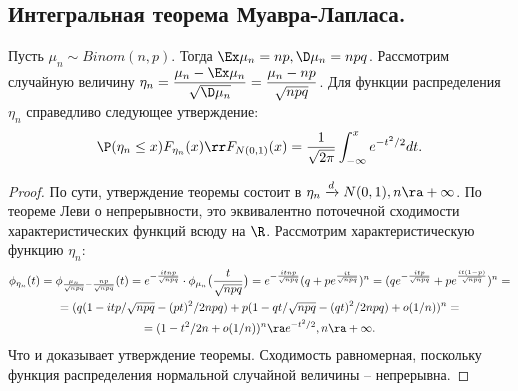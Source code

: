 \subsection{Интегральная теорема Муавра-Лапласа.}
\begin{theorem}
    Пусть $\mu_n \sim Binom(n, p)$.
    Тогда $\Ex \mu_n = np, \D \mu_n = npq$.
    Рассмотрим случайную величину $\eta_n = \dfrac{\mu_n - \Ex \mu_n}{\sqrt {\D \mu_n}} = \dfrac{\mu_n - np}{\sqrt {npq}}$.
    Для функции распределения $\eta_n$ справедливо следующее утверждение: \[\P(\eta_n \leq x) F_{\eta_n}(x) \rr F_{N(0, 1)}(x) = \dfrac{1}{\sqrt {2\pi}}\int_{-\infty}^x e^{-t^2/2}dt.\]
\end{theorem}
\begin{proof}
    По сути, утверждение теоремы состоит в $\eta_n \xrightarrow{d} N(0, 1), n \ra +\infty$.
    По теореме Леви о непрерывности, это эквивалентно поточечной сходимости характеристических функций всюду на $\R$.
    Рассмотрим характеристическую функцию $\eta_n$:
    \begin{multline*}
        \phi_{\eta_n}(t) = \phi_{\frac{\mu_n}{\sqrt {npq}} - \frac{np}{\sqrt {npq}}}(t) = e^{-\frac{itnp}{\sqrt {npq}}}\cdot \phi_{\mu_n}\big(\frac{t}{\sqrt {npq}}\big) = e^{-\frac{itnp}{\sqrt {npq}}}(q + pe^{\frac{it}{\sqrt {npq}}})^n
        = (qe^{-\frac{itp}{\sqrt {npq}}} + pe^{\frac{it(1 - p)}{\sqrt {npq}}})^n = \\ = (q(1 - itp/\sqrt {npq} - (pt)^2/2npq) + p(1 - qt/\sqrt {npq} - (qt)^2/2npq) + o(1/n))^n = \\ =
        (1 - t^2/2n + o(1/n))^n \ra e^{-t^2/2}, n \ra +\infty.
    \end{multline*}
    Что и доказывает утверждение теоремы.
    Сходимость равномерная, поскольку функция распределения нормальной случайной величины -- непрерывна.
\end{proof}
